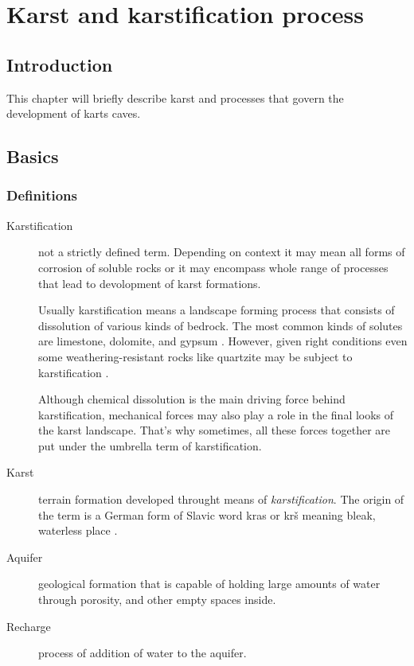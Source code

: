 \chapter{Karst and karstification process}
\section{Introduction}
This chapter will briefly describe karst and processes that govern the
development of karts caves.
\section{Basics}

\subsection{Definitions}
\begin{description}
  \item[Karstification]
    not a strictly defined term. Depending on context it may
    mean all forms of corrosion of soluble rocks or it may encompass whole range of
    processes that lead to devolopment of karst formations.
    
    Usually karstification means a landscape forming process that consists of dissolution
    of various kinds of bedrock. The most common kinds of solutes are limestone,
    dolomite, and gypsum \parencite{karstglossary}. However, given right conditions
    even some weathering-resistant rocks like quartzite may be subject to 
    karstification \parencite{migon2010}.
    
    Although chemical dissolution is the main driving force behind karstification,
    mechanical forces may also play a role in the final looks of the karst landscape.
    That's why sometimes, all these forces together are put under the umbrella term
    of karstification.

  \item[Karst]
    terrain formation developed throught means of
    \emph{karstification}. The origin of the term is a German form of Slavic word
    kras or krš meaning bleak, waterless place \parencite{karstglossary}.
  \item[Aquifer]
    geological formation that is capable of holding large amounts of water
    through porosity, and other empty spaces inside.
  \item[Recharge]
    process of addition of water to the aquifer.
\end{description}
